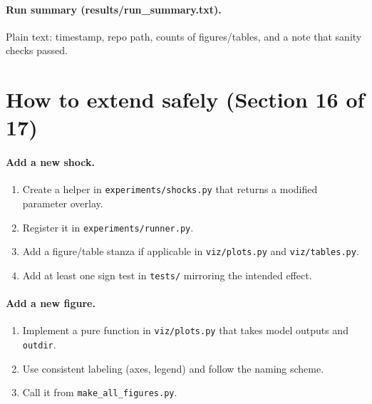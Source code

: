 \documentclass[12pt,a4paper]{article}
\newcommand{\code}[1]{\texttt{#1}}
\begin{document}
\paragraph{Run summary (results/run\_summary.txt).} Plain text: timestamp, repo path, counts of figures/tables, and a note that sanity checks passed.



\section{How to extend safely (Section 16 of 17)}
\paragraph{Add a new shock.}
\begin{enumerate}[leftmargin=1.5em]
  \item Create a helper in \code{experiments/shocks.py} that returns a modified parameter overlay.
  \item Register it in \code{experiments/runner.py}.
  \item Add a figure/table stanza if applicable in \code{viz/plots.py} and \code{viz/tables.py}.
  \item Add at least one sign test in \code{tests/} mirroring the intended effect.
\end{enumerate}

\paragraph{Add a new figure.}
\begin{enumerate}[leftmargin=1.5em]
  \item Implement a pure function in \code{viz/plots.py} that takes model outputs and \code{outdir}.
  \item Use consistent labeling (axes, legend) and follow the naming scheme.
  \item Call it from \code{make\_all\_figures.py}.
\end{enumerate}
\end{document}
